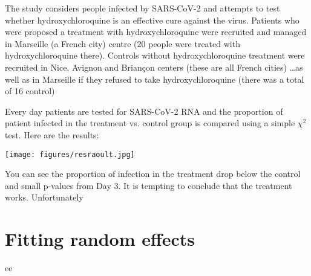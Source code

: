 \documentclass[12pt,a4paper]{scrartcl}\usepackage[]{graphicx}\usepackage[]{color}
\begin{document}
The study considers people infected by SARS-CoV-2 and attempts to test whether hydroxychloroquine is an effective cure against the virus.
Patients who were proposed a treatment with hydroxychloroquine were recruited and managed in Marseille (a French city) centre (20 people were treated with hydroxychloroquine there). Controls without hydroxychloroquine treatment were recruited in Nice, Avignon and Briançon centers (these are all French cities) \dots as well as in Marseille if they refused to take hydroxychloroquine (there was a total of 16 control)

Every day patients are tested for SARS-CoV-2 RNA and the proportion of patient infected in the treatment vs. control group is compared using a simple $\chi^2$ test. Here are the results:

\begin{center}
\texttt{[image: figures/resraoult.jpg]}
\end{center}

You can see the proportion of infection in the treatment drop below the control and small p-values from Day 3. It is tempting to conclude that the treatment works. Unfortunately



\section{Fitting random effects}

\begin{tcolorbox}[colback=green!5,colframe=green!40!black,title=A nice heading]
ee
\end{tcolorbox}

\section{}


\begin{Exercise}[difficulty=1, title={xxx}]

\end{Exercise}
\begin{Answer}

\end{Answer}
\end{document}
